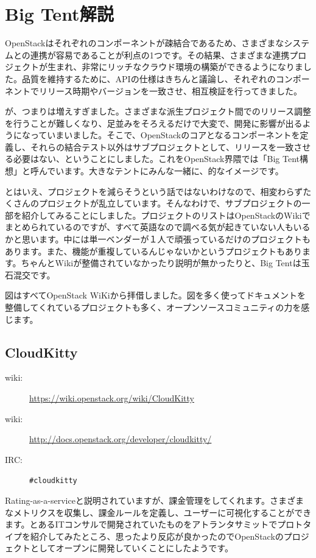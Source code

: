 \chapter{Big Tent解説}
OpenStackはそれぞれのコンポーネントが疎結合であるため、さまざまなシステムとの連携が容易であることが利点の1つです。その結果、さまざまな連携プロジェクトが生まれ、非常にリッチなクラウド環境の構築ができるようになりました。品質を維持するために、APIの仕様はきちんと議論し、それぞれのコンポーネントでリリース時期やバージョンを一致させ、相互検証を行ってきました。

が、つまりは増えすぎました。さまざまな派生プロジェクト間でのリリース調整を行うことが難しくなり、足並みをそろえるだけで大変で、開発に影響が出るようになっていまいました。そこで、OpenStackのコアとなるコンポーネントを定義し、それらの結合テスト以外はサブプロジェクトとして、リリースを一致させる必要はない、ということにしました。これをOpenStack界隈では「Big Tent構想」と呼んでいます。大きなテントにみんな一緒に、的なイメージです。

とはいえ、プロジェクトを減らそうという話ではないわけなので、相変わらずたくさんのプロジェクトが乱立しています。そんなわけで、サブプロジェクトの一部を紹介してみることにしました。プロジェクトのリストはOpenStackのWikiでまとめられているのですが、すべて英語なので調べる気が起きていない人もいるかと思います。中には単一ベンダーが１人で頑張っているだけのプロジェクトもあります。また、機能が重複しているんじゃないかというプロジェクトもあります。ちゃんとWikiが整備されていなかったり説明が無かったりと、Big Tentは玉石混交です。

図はすべてOpenStack WiKiから拝借しました。図を多く使ってドキュメントを整備してくれているプロジェクトも多く、オープンソースコミュニティの力を感じます。

\section{CloudKitty}

\begin{description}
	\item[wiki:] \url{https://wiki.openstack.org/wiki/CloudKitty}
	\item[wiki:] \url{http://docs.openstack.org/developer/cloudkitty/}
	\item[IRC:] \verb|#cloudkitty|
\end{description}

Rating-as-a-serviceと説明されていますが、課金管理をしてくれます。さまざまなメトリクスを収集し、課金ルールを定義し、ユーザーに可視化することができます。とあるITコンサルで開発されていたものをアトランタサミットでプロトタイプを紹介してみたところ、思ったより反応が良かったのでOpenStackのプロジェクトとしてオープンに開発していくことにしたようです。

